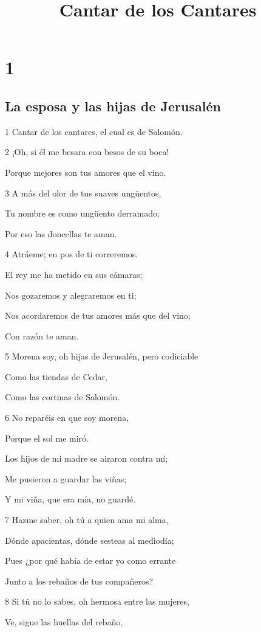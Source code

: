 

\title{Cantar de los Cantares}

\chapter{1}

\section*{La esposa y las hijas de Jerusalén}

\par 1 Cantar de los cantares, el cual es de Salomón. 
\par 2 ¡Oh, si él me besara con besos de su boca!
\par Porque mejores son tus amores que el vino.
\par 3 A más del olor de tus suaves ungüentos,
\par Tu nombre es como ungüento derramado;
\par Por eso las doncellas te aman.
\par 4 Atráeme; en pos de ti correremos.
\par El rey me ha metido en sus cámaras;
\par Nos gozaremos y alegraremos en ti;
\par Nos acordaremos de tus amores más que del vino;
\par Con razón te aman.
\par 5 Morena soy, oh hijas de Jerusalén, pero codiciable
\par Como las tiendas de Cedar,
\par Como las cortinas de Salomón.
\par 6 No reparéis en que soy morena,
\par Porque el sol me miró.
\par Los hijos de mi madre se airaron contra mí;
\par Me pusieron a guardar las viñas;
\par Y mi viña, que era mía, no guardé.
\par 7 Hazme saber, oh tú a quien ama mi alma,
\par Dónde apacientas, dónde sesteas al mediodía;
\par Pues ¿por qué había de estar yo como errante
\par Junto a los rebaños de tus compañeros?
\par 8 Si tú no lo sabes, oh hermosa entre las mujeres,
\par Ve, sigue las huellas del rebaño,
